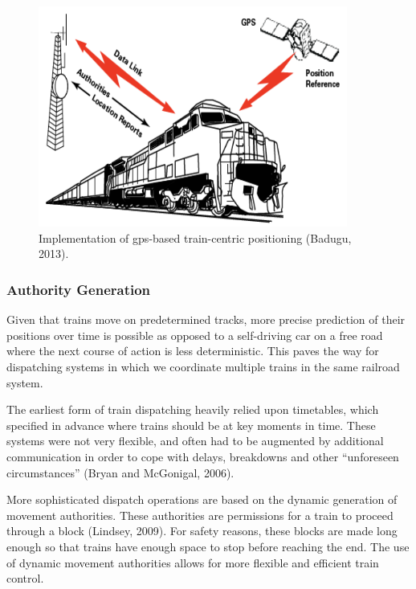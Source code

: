 \documentclass[11pt, titlepage]{article}
\begin{document}
\begin{figure}[ht]
    \begin{center}
        \includegraphics[width=4in]{PTCDiagram.png}
        \caption{Implementation of \gls{gps}-based train-centric positioning
        (Badugu, 2013).}
    \end{center}
\end{figure}

\subsubsection{Authority Generation}

Given that trains move on predetermined tracks, more precise prediction of their
positions over time is possible as opposed to a self-driving car on a free road
where the next course of action is less deterministic. This paves the way for
dispatching systems in which we coordinate multiple trains in the same railroad
system.

The earliest form of train dispatching heavily relied upon timetables, which
specified in advance where trains should be at key moments in time. These systems
were not very flexible, and often had to be augmented by additional communication
in order to cope with delays, breakdowns and other ``unforeseen circumstances''
(Bryan and McGonigal, 2006).

More sophisticated dispatch operations are based on the dynamic generation of
movement authorities. These authorities are permissions for a train to proceed
through a block (Lindsey, 2009). For safety reasons, these blocks are made long
enough so that trains have enough space to stop before reaching the end. The use of
dynamic movement authorities allows for more flexible and efficient train control.
\end{document}
